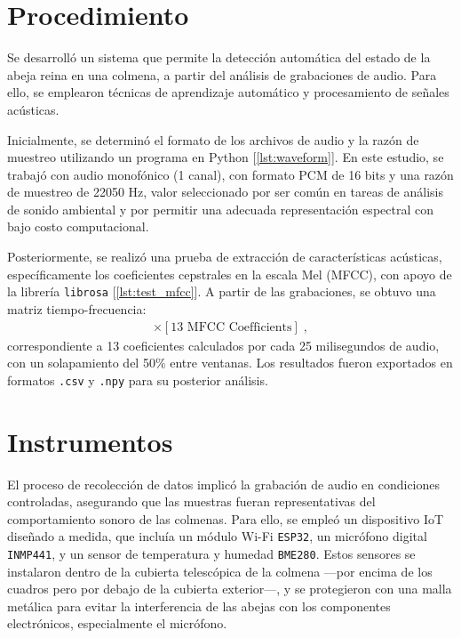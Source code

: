 \documentclass[12pt]{report}
\newenvironment{tightmulticols}{%
  \begin{multicols}{2}
  \setlength{\parskip}{0pt}
  \setlength{\parindent}{0em}
  \linespread{1}\selectfont
}{%
  \end{multicols}
}
\begin{document}
\begin{tightmulticols}

\section{Procedimiento}

\par Se desarrolló un sistema que permite la detección automática del estado de la abeja reina en una colmena, a partir del análisis de grabaciones de audio. Para ello, se emplearon técnicas de aprendizaje automático y procesamiento de señales acústicas.

\par Inicialmente, se determinó el formato de los archivos de audio y la razón de muestreo utilizando un programa en Python [\ref{lst:waveform}]. En este estudio, se trabajó con audio monofónico (1 canal), con formato PCM de 16 bits y una razón de muestreo de 22050 Hz, valor seleccionado por ser común en tareas de análisis de sonido ambiental y por permitir una adecuada representación espectral con bajo costo computacional.

\par Posteriormente, se realizó una prueba de extracción de características acústicas, específicamente los coeficientes cepstrales en la escala Mel (MFCC), con apoyo de la librería \texttt{librosa} [\ref{lst:test_mfcc}]. A partir de las grabaciones, se obtuvo una matriz tiempo-frecuencia:
\begin{align*}
[\text{Time Frames}] \times [\text{13 MFCC Coefficients}] \; ,
\end{align*}
correspondiente a 13 coeficientes calculados por cada 25 milisegundos de audio, con un solapamiento del 50\% entre ventanas. Los resultados fueron exportados en formatos \texttt{.csv} y \texttt{.npy} para su posterior análisis.

\section{Instrumentos}

\par El proceso de recolección de datos implicó la grabación de audio en condiciones controladas, asegurando que las muestras fueran representativas del comportamiento sonoro de las colmenas. Para ello, se empleó un dispositivo IoT diseñado a medida, que incluía un módulo Wi-Fi \texttt{ESP32}, un micrófono digital \texttt{INMP441}, y un sensor de temperatura y humedad \texttt{BME280}. Estos sensores se instalaron dentro de la cubierta telescópica de la colmena —por encima de los cuadros pero por debajo de la cubierta exterior—, y se protegieron con una malla metálica para evitar la interferencia de las abejas con los componentes electrónicos, especialmente el micrófono.


\end{tightmulticols}
\end{document}
